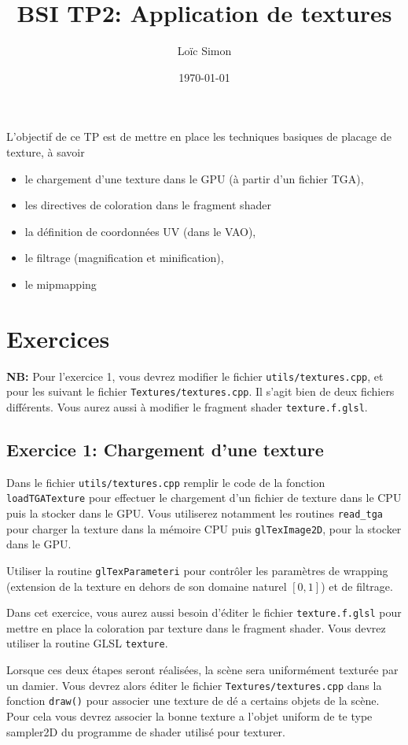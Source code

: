 \documentclass{article}
\author{Loïc Simon}
\title{BSI TP2: Application de textures}
\date{\today}
\begin{document}
\maketitle

L'objectif de ce TP est de mettre en place les techniques basiques de placage de
texture, à savoir
\begin{itemize}
\item le chargement d'une texture dans le GPU (à partir d'un fichier TGA),
\item les directives de coloration dans le fragment shader
\item la définition de coordonnées UV (dans le VAO),
\item le filtrage (magnification et minification),
\item le mipmapping
\end{itemize}

\section{Exercices}
{\bf NB:} Pour l'exercice 1, vous devrez modifier le fichier
\verb|utils/textures.cpp|, et pour les suivant le fichier
\verb|Textures/textures.cpp|. Il s'agit bien de deux fichiers différents. Vous
aurez aussi à modifier le fragment shader \verb|texture.f.glsl|.         

\subsection{Exercice 1: Chargement d'une texture}%
Dans le fichier \verb|utils/textures.cpp| remplir le code de la fonction \verb|loadTGATexture| pour effectuer le
chargement d'un fichier de texture dans le CPU puis la stocker dans le GPU.
Vous utiliserez notamment les routines \verb|read_tga| pour charger la texture
dans la mémoire CPU puis \verb|glTexImage2D|, pour la stocker dans le GPU.

Utiliser la routine \verb|glTexParameteri| pour contrôler les paramètres de
wrapping (extension de la texture en dehors de son domaine naturel $[0,1]$) et
de filtrage.

Dans cet exercice, vous aurez aussi besoin d'éditer le fichier
\verb|texture.f.glsl| pour mettre en place la coloration par texture dans le
fragment shader. Vous devrez utiliser la routine GLSL \verb|texture|.

Lorsque ces deux étapes seront réalisées, la scène sera uniformément texturée
par un damier. Vous devrez alors éditer le fichier \verb|Textures/textures.cpp|
dans la fonction \verb|draw()| pour associer une texture de dé a certains objets
de la scène. Pour cela vous devrez associer la bonne texture a l'objet uniform
de te type sampler2D du programme de shader utilisé pour texturer.
\end{document}
